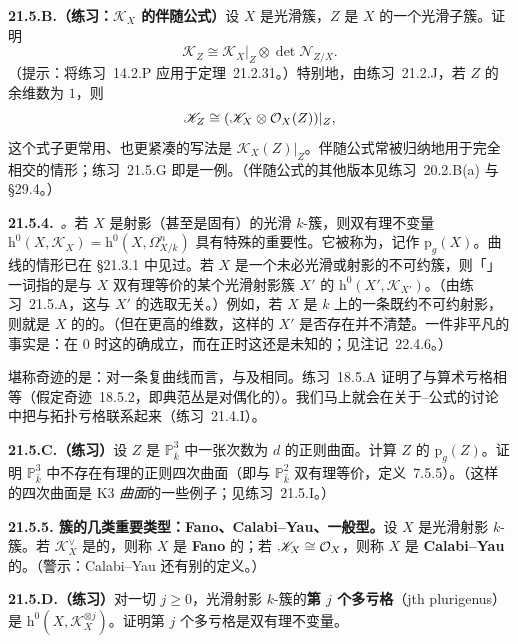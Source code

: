 \textbf{21.5.B.（练习：$\mathscr{K}_X$ 的伴随公式）}\quad 设 $X$ 是光滑簇，$Z$ 是 $X$ 的一个光滑子簇。证明
\[
\mathscr{K}_Z\cong\mathscr{K}_X|_Z\otimes\det\mathscr{N}_{Z/X}.
\]
（提示：将\mbox{练习~14.2.P} 应用于\mbox{定理~21.2.31}。）特别地，由\mbox{练习~21.2.J}，若 $Z$ 的余维数为 $1$，则
\[
\mathscr{K}_Z\cong(\mathscr{K}_X\otimes\mathcal{O}_X(Z))|_Z,
\]
这个式子更常用、也更紧凑的写法是 $\mathscr{K}_X(Z)|_Z$。伴随公式常被归纳地用于完全相交的情形；\mbox{练习~21.5.G} 即是一例。（伴随公式的其他版本见\mbox{练习~20.2.B(a)} 与 \S29.4。）

\textbf{21.5.4.}\ \emph{\trhDefinition。}\quad 若 $X$ 是射影（甚至是固有）的光滑 $k$-簇，则双有理不变量 $\mathrm{h}^0(X,\mathscr{K}_X)=\mathrm{h}^0(X,\Omega^n_{X/k})$ 具有特殊的重要性。它被称为\textbf{\trGeometricGenus}，记作 $\mathrm{p}_g(X)$。曲线的情形已在 \S21.3.1 中见过。若 $X$ 是一个未必光滑或射影的不可约簇，则「\trGeometricGenus」一词指的是与 $X$ 双有理等价的某个光滑射影簇 $X'$ 的 $\mathrm{h}^0(X',\mathscr{K}_{X'})$。（由\mbox{练习~21.5.A}，这与 $X'$ 的选取无关。）例如，若 $X$ 是 $k$ 上的一条既约不可约射影\trCurve，则\trGeometricGenus{}就是 $X$ 的\trNormalization{}的\trGenus。（但在更高的维数，这样的 $X'$ 是否存在并不清楚。一件非平凡的事实是：在\trCharacteristic{} $0$ 时这的确成立，而在正\trCharacteristic{}时这还是未知的；见\mbox{注记~22.4.6}。）

堪称奇迹的是：对一条复曲线而言，\trGeometricGenus{}与\trTopologicalGenus{}及\trArithmeticGenus{}相同。\mbox{练习~18.5.A} 证明了\trGeometricGenus{}与算术亏格相等（假定\mbox{奇迹~18.5.2}，即典范丛是\trSerre{}对偶化的）。我们马上就会在关于\trRiemann--\trHurwitz{}公式的讨论中把\trGeometricGenus{}与拓扑亏格联系起来（\mbox{练习~21.4.I}）。

\textbf{21.5.C.（练习）}\quad 设 $Z$ 是 $\mathbb{P}^3_{\bar{k}}$ 中一张次数为 $d$ 的正则曲面。计算 $Z$ 的\trGeometricGenus{} $\mathrm{p}_g(Z)$。证明 $\mathbb{P}^3_{\bar{k}}$ 中不存在有理的正则四次曲面（即与 $\mathbb{P}^2_{\bar{k}}$ 双有理等价，\mbox{定义~7.5.5}）。（这样的四次曲面是 K3 \emph{曲面}的一些例子；见\mbox{练习~21.5.I}。）

\textbf{21.5.5. 簇的几类重要类型：Fano、Calabi--Yau、一般型。}\quad 设 $X$ 是光滑射影 $k$-簇。若 $\mathscr{K}_X^\vee$ 是\trAmple{}的，则称 $X$ 是 \textbf{Fano} 的；若 $\mathscr{K}_X\cong\mathcal{O}_X$，则称 $X$ 是 \textbf{Calabi--Yau} 的。（警示：Calabi--Yau 还有别的定义。）

\textbf{21.5.D.（练习）}\quad 对一切 $j\ge 0$，光滑射影 $k$-簇的\textbf{第 $j$ 个多亏格}（jth plurigenus）是 $\mathrm{h}^0(X,\mathscr{K}_X^{\otimes j})$。证明第 $j$ 个多亏格是双有理不变量。

